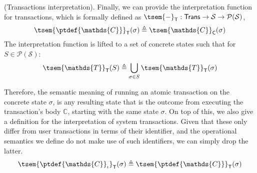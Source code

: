 \begin{defn}
	(Transactions interpretation).
	Finally, we can provide the interpretation function for transactions, which is formally defined as $\tsem{-}_\mathsf{T} : \mathsf{Trans} \rightarrow \mathcal{S} \rightarrow \mathcal{P}(\mathcal{S})$,
	\[
		\tsem{\ptdef{\mathds{C}}}_\mathsf{T}(\sigma) \triangleq \tsem{\mathds{C}}_\mathsf{C}(\sigma)
	\]
	The interpretation function is lifted to a set of concrete states such that for $S \in \mathcal{P}(\mathcal{S})$:
	\[
		\tsem{\mathds{T}}_\mathsf{T}(S) \triangleq \bigcup_{\sigma \in S}  \tsem{\mathds{T}}_\mathsf{T}(\sigma)
	\]
\end{defn}
Therefore, the semantic meaning of running an atomic transaction on the concrete state $\sigma$, is any resulting state that is the outcome from executing the transaction's body $\mathds{C}$, starting with the same state $\sigma$. On top of this, we also give a definition for the interpretation of system transactions. Given that these only differ from user transactions in terms of their identifier, and the operational semantics we define do not make use of such identifiers, we can simply drop the latter.
\[
	\tsem{\ptdef{\mathds{C}}_\iota}_\mathsf{T}(\sigma) \triangleq \tsem{\ptdef{\mathds{C}}}_\mathsf{T}(\sigma)
\]